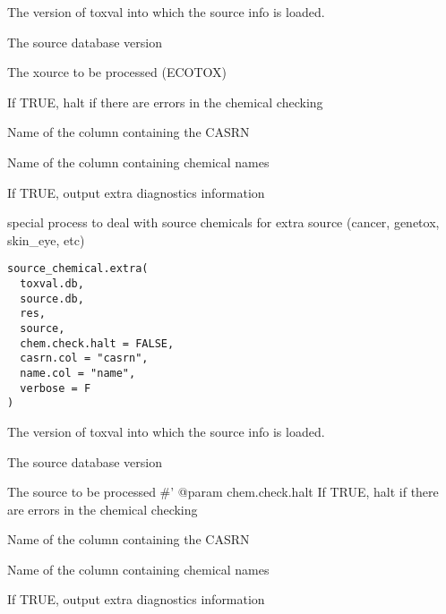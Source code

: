 \documentclass[letterpaper]{book}
\begin{document}
\begin{Arguments}
\begin{ldescription}
\item[\code{toxval.db}] The version of toxval into which the source info is loaded.

\item[\code{source.db}] The source database version

\item[\code{source}] The xource to be processed (ECOTOX)

\item[\code{chem.check.halt}] If TRUE, halt if there are errors in the chemical checking

\item[\code{casrn.col}] Name of the column containing the CASRN

\item[\code{name.col}] Name of the column containing chemical names

\item[\code{verbose}] If TRUE, output extra diagnostics information
\end{ldescription}
\end{Arguments}
%
\begin{Description}\relax
special process to deal with source chemicals for extra source (cancer, genetox, skin\_eye, etc)
\end{Description}
%
\begin{Usage}
\begin{verbatim}
source_chemical.extra(
  toxval.db,
  source.db,
  res,
  source,
  chem.check.halt = FALSE,
  casrn.col = "casrn",
  name.col = "name",
  verbose = F
)
\end{verbatim}
\end{Usage}
%
\begin{Arguments}
\begin{ldescription}
\item[\code{toxval.db}] The version of toxval into which the source info is loaded.

\item[\code{source.db}] The source database version

\item[\code{source}] The source to be processed \#' @param chem.check.halt If TRUE, halt if there are errors in the chemical checking

\item[\code{casrn.col}] Name of the column containing the CASRN

\item[\code{name.col}] Name of the column containing chemical names

\item[\code{verbose}] If TRUE, output extra diagnostics information
\end{ldescription}
\end{Arguments}
\end{document}
